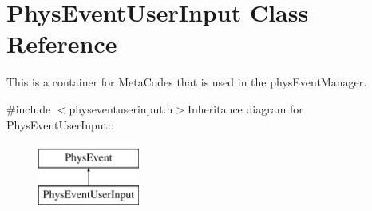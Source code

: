 \hypertarget{classPhysEventUserInput}{
\section{PhysEventUserInput Class Reference}
\label{dc/d0e/classPhysEventUserInput}
}


This is a container for MetaCodes that is used in the physEventManager.  


{\ttfamily \#include $<$physeventuserinput.h$>$}Inheritance diagram for PhysEventUserInput::\begin{figure}[H]
\begin{center}
\leavevmode
\includegraphics[height=2cm]{dc/d0e/classPhysEventUserInput}
\end{center}
\end{figure}
